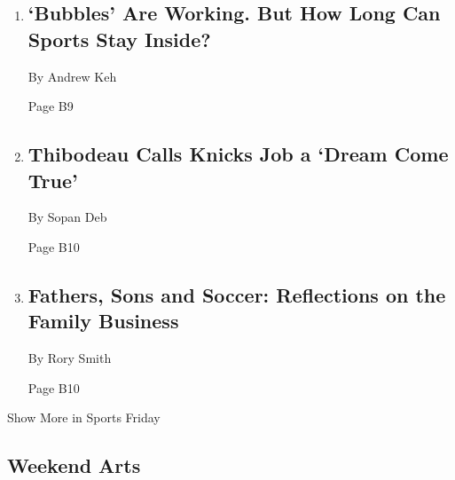 \begin{enumerate}
\def\labelenumi{\arabic{enumi}.}
\item
  \href{/2020/07/30/sports/basketball/sports-bubble-nba-mlb.html}{}

  \hypertarget{bubbles-are-working-but-how-long-can-sports-stay-inside-1}{%
  \subsection{`Bubbles' Are Working. But How Long Can Sports Stay
  Inside?}\label{bubbles-are-working-but-how-long-can-sports-stay-inside-1}}

  By Andrew Keh

  Page B9
\item
  \href{/2020/07/30/sports/basketball/nba-knicks-coach-tom-thibodeau.html}{}

  \hypertarget{thibodeau-calls-knicks-job-a-dream-come-true}{%
  \subsection{Thibodeau Calls Knicks Job a `Dream Come
  True'}\label{thibodeau-calls-knicks-job-a-dream-come-true}}

  By Sopan Deb

  Page B10
\item
  \href{/2020/07/28/sports/soccer/erling-haaland-gio-reyna-thuram.html}{}

  \hypertarget{fathers-sons-and-soccer-reflections-on-the-family-business}{%
  \subsection{Fathers, Sons and Soccer: Reflections on the Family
  Business}\label{fathers-sons-and-soccer-reflections-on-the-family-business}}

  By Rory Smith

  Page B10
\end{enumerate}

Show More in Sports Friday

\hypertarget{weekend-arts}{%
\subsection{Weekend Arts}\label{weekend-arts}}

